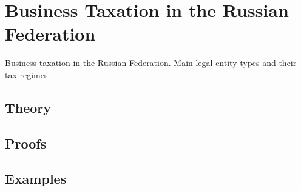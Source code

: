 
\section{Business Taxation in the Russian Federation}
\label{sec:2.6.19-taxation-rf}

\begin{ticket}
Business taxation in the Russian Federation. Main legal entity types and their tax regimes.
\end{ticket}

\subsection*{Theory}

\subsection*{Proofs}

\subsection*{Examples}

